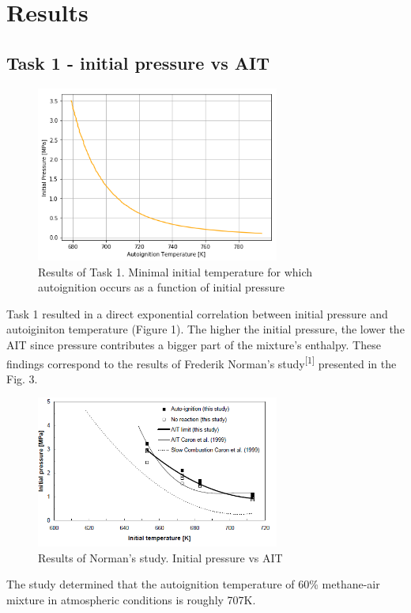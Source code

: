 \documentclass[a4paper]{article}[11pt]
\begin{document}
    \section{Results}
    \subsection{Task 1 - initial pressure vs AIT}
\begin{figure}[h]
\centering
\includegraphics[width=8cm]{1.png}
\caption{Results of Task 1. Minimal initial temperature for which autoignition occurs as a function of initial pressure}
\end{figure}

Task 1 resulted in a direct exponential correlation between initial pressure and autoiginiton temperature (Figure 1). The higher the initial pressure, the lower the AIT since pressure contributes a bigger part of the mixture's enthalpy. These findings correspond to the results of Frederik Norman's study\textsuperscript{[1]} presented in the Fig. 3. 

\begin{figure}[h]
\centering
\includegraphics[width=8cm]{norman.PNG}
\caption{Results of Norman's study. Initial pressure vs AIT}
\end{figure}

The study determined that the autoignition temperature of 60\% methane-air mixture in atmospheric conditions is roughly 707K. 
\end{document}
